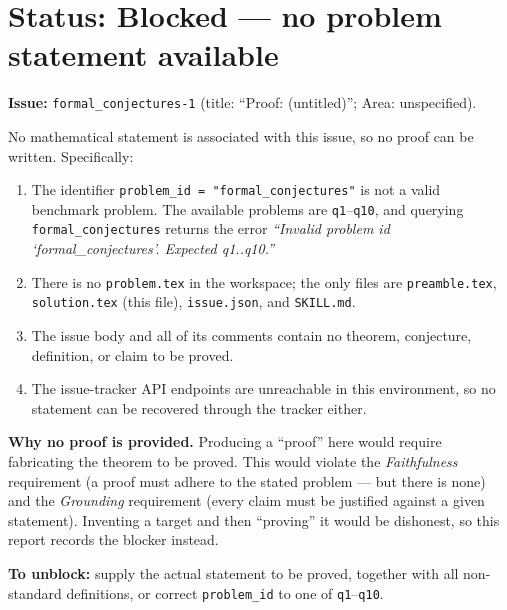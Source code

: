 \documentclass[12pt]{article}
\begin{document}
\section*{Status: Blocked --- no problem statement available}

\textbf{Issue:} \texttt{formal\_conjectures-1} (title: ``Proof: (untitled)'';
Area: unspecified).

\medskip

No mathematical statement is associated with this issue, so no proof can be
written. Specifically:

\begin{enumerate}[label=(\arabic*)]
  \item The identifier \texttt{problem\_id = "formal\_conjectures"} is not a
        valid benchmark problem. The available problems are \texttt{q1}--\texttt{q10},
        and querying \texttt{formal\_conjectures} returns the error
        \emph{``Invalid problem id `formal\_conjectures'. Expected q1..q10.''}
  \item There is no \texttt{problem.tex} in the workspace; the only files are
        \texttt{preamble.tex}, \texttt{solution.tex} (this file),
        \texttt{issue.json}, and \texttt{SKILL.md}.
  \item The issue body and all of its comments contain no theorem, conjecture,
        definition, or claim to be proved.
  \item The issue-tracker API endpoints are unreachable in this environment, so
        no statement can be recovered through the tracker either.
\end{enumerate}

\medskip

\noindent\textbf{Why no proof is provided.}
Producing a ``proof'' here would require fabricating the theorem to be proved.
This would violate the \emph{Faithfulness} requirement (a proof must adhere to
the stated problem --- but there is none) and the \emph{Grounding} requirement
(every claim must be justified against a given statement). Inventing a target
and then ``proving'' it would be dishonest, so this report records the blocker
instead.

\medskip

\noindent\textbf{To unblock:} supply the actual statement to be proved, together
with all non-standard definitions, or correct \texttt{problem\_id} to one of
\texttt{q1}--\texttt{q10}.
\end{document}
